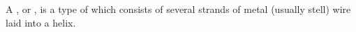 \begin{module}[id=cable]
  \begin{definition}
    A , or , is a type of  which consists
    of several strands of metal (usually stell) wire laid into a helix.
  \end{definition}
\end{module}
